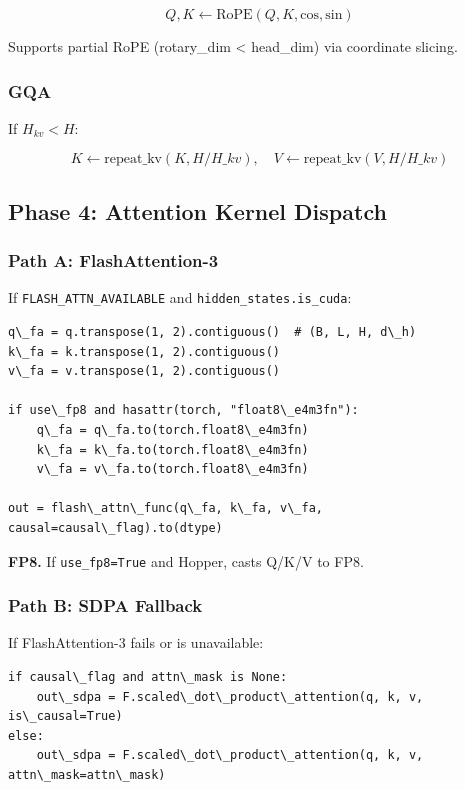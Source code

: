 \[
Q, K \leftarrow \text{RoPE}(Q, K, \text{cos}, \text{sin})
\tag{4.2}
\]

Supports partial RoPE (rotary\_dim \textless{} head\_dim) via coordinate slicing.

\subsubsection{GQA}

If $H_{kv} < H$:

\[
K \leftarrow \text{repeat\_kv}(K, H/H\_{kv}), \quad
V \leftarrow \text{repeat\_kv}(V, H/H\_{kv})
\tag{4.3}
\]

\subsection{Phase 4: Attention Kernel Dispatch}

\subsubsection{Path A: FlashAttention-3}

If \texttt{FLASH\_ATTN\_AVAILABLE} and \texttt{hidden\_states.is\_cuda}:

\begin{lstlisting}
q\_fa = q.transpose(1, 2).contiguous()  # (B, L, H, d\_h)
k\_fa = k.transpose(1, 2).contiguous()
v\_fa = v.transpose(1, 2).contiguous()

if use\_fp8 and hasattr(torch, "float8\_e4m3fn"):
    q\_fa = q\_fa.to(torch.float8\_e4m3fn)
    k\_fa = k\_fa.to(torch.float8\_e4m3fn)
    v\_fa = v\_fa.to(torch.float8\_e4m3fn)

out = flash\_attn\_func(q\_fa, k\_fa, v\_fa, causal=causal\_flag).to(dtype)
\end{lstlisting}

\textbf{FP8.} If \texttt{use\_fp8=True} and Hopper, casts Q/K/V to FP8.

\subsubsection{Path B: SDPA Fallback}

If FlashAttention-3 fails or is unavailable:

\begin{lstlisting}
if causal\_flag and attn\_mask is None:
    out\_sdpa = F.scaled\_dot\_product\_attention(q, k, v, is\_causal=True)
else:
    out\_sdpa = F.scaled\_dot\_product\_attention(q, k, v, attn\_mask=attn\_mask)
\end{lstlisting}

